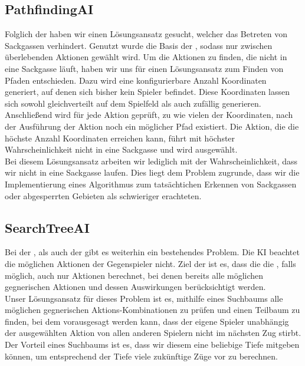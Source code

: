 \subsection{PathfindingAI}
\label{subsec:pathfinding-ai}

Folglich der  haben wir einen Lösungsansatz gesucht, welcher das Betreten von Sackgassen
verhindert.
Genutzt wurde die Basis der , sodass nur zwischen überlebenden Aktionen gewählt wird.
Um die Aktionen zu finden, die nicht in eine Sackgasse läuft, haben wir uns für einen Lösungsansatz zum Finden von
Pfaden entschieden.
Dazu wird eine konfigurierbare Anzahl Koordinaten generiert, auf denen sich bisher kein Spieler befindet.
Diese Koordinaten lassen sich sowohl gleichverteilt auf dem Spielfeld als auch zufällig generieren.
Anschließend wird für jede Aktion geprüft, zu wie vielen der Koordinaten, nach der Ausführung der Aktion noch ein
möglicher Pfad existiert. 
Die Aktion, die die höchste Anzahl Koordinaten erreichen kann, führt mit höchster Wahrscheinlichkeit
nicht in eine Sackgasse und wird ausgewählt. \\

Bei diesem Lösungsansatz arbeiten wir lediglich mit der Wahrscheinlichkeit, dass wir nicht in eine Sackgasse laufen.
Dies liegt dem Problem zugrunde, dass wir die Implementierung eines Algorithmus zum tatsächtichen Erkennen von
Sackgassen oder abgesperrten Gebieten als schwieriger erachteten.

\subsection{SearchTreeAI}
\label{subsec:searchtree-ai}

Bei der , als auch der  gibt es weiterhin ein bestehendes
Problem.
Die \ac{KI} beachtet die möglichen Aktionen der Gegenspieler nicht.
Ziel der  ist es, dass die die , falls möglich, auch nur Aktionen berechnet,
bei denen bereits alle möglichen gegnerischen Aktionen und dessen Auswirkungen berücksichtigt werden. \\

Unser Lösungsansatz für dieses Problem ist es, mithilfe eines Suchbaums alle möglichen gegnerischen
Aktions-Kombinationen zu prüfen und einen Teilbaum zu finden, bei dem vorausgesagt werden kann, dass
der eigene Spieler unabhängig der ausgewählten Aktion von allen anderen Spielern nicht im nächsten Zug stirbt.
Der Vorteil eines Suchbaums ist es, dass wir diesem eine
beliebige Tiefe mitgeben können, um entsprechend der Tiefe viele zukünftige Züge vor zu berechnen.

